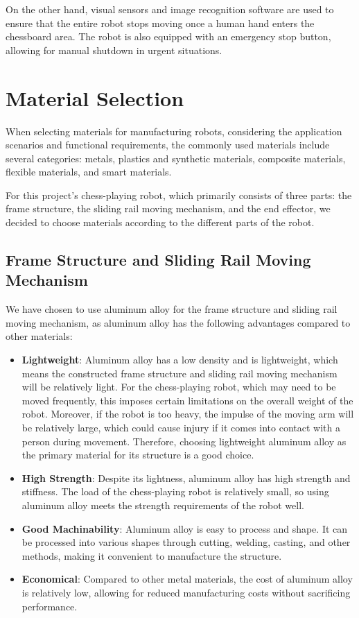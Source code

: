 \documentclass[10pt, a4paper, twocolumn]{article}
\begin{document}
On the other hand, visual sensors and image recognition software are used to ensure that the entire robot stops moving once a human hand enters the chessboard area. The robot is also equipped with an emergency stop button, allowing for manual shutdown in urgent situations.

\section{Material Selection}
When selecting materials for manufacturing robots, considering the application scenarios and functional requirements, the commonly used materials include several categories: metals, plastics and synthetic materials, composite materials, flexible materials, and smart materials.

For this project's chess-playing robot, which primarily consists of three parts: the frame structure, the sliding rail moving mechanism, and the end effector, we decided to choose materials according to the different parts of the robot.

\subsection{Frame Structure and Sliding Rail Moving Mechanism}
We have chosen to use aluminum alloy for the frame structure and sliding rail moving mechanism, as aluminum alloy has the following advantages compared to other materials:

\begin{itemize}
    \item \textbf{Lightweight}: Aluminum alloy has a low density and is lightweight, which means the constructed frame structure and sliding rail moving mechanism will be relatively light. For the chess-playing robot, which may need to be moved frequently, this imposes certain limitations on the overall weight of the robot. Moreover, if the robot is too heavy, the impulse of the moving arm will be relatively large, which could cause injury if it comes into contact with a person during movement. Therefore, choosing lightweight aluminum alloy as the primary material for its structure is a good choice.
    \item \textbf{High Strength}: Despite its lightness, aluminum alloy has high strength and stiffness. The load of the chess-playing robot is relatively small, so using aluminum alloy meets the strength requirements of the robot well.
    \item \textbf{Good Machinability}: Aluminum alloy is easy to process and shape. It can be processed into various shapes through cutting, welding, casting, and other methods, making it convenient to manufacture the structure.
    \item \textbf{Economical}: Compared to other metal materials, the cost of aluminum alloy is relatively low, allowing for reduced manufacturing costs without sacrificing performance.
\end{itemize}
\end{document}

